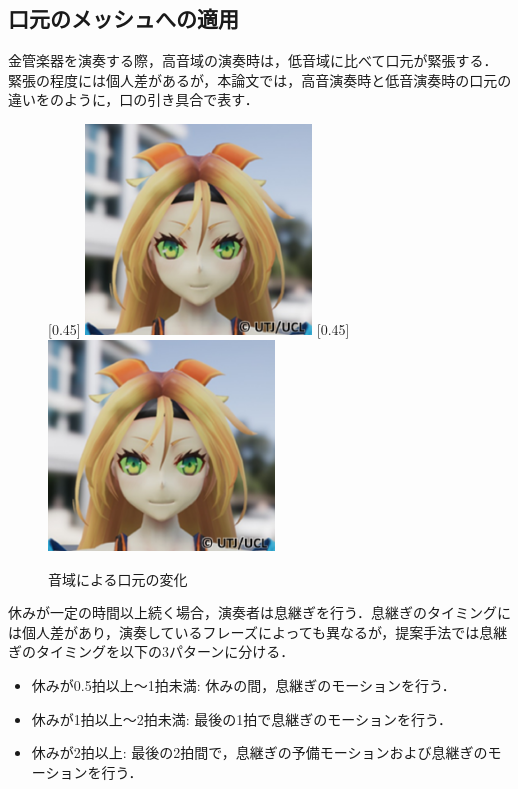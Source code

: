 \subsection{口元のメッシュへの適用}
\indent
金管楽器を演奏する際，高音域の演奏時は，低音域に比べて口元が緊張する．
緊張の程度には個人差があるが，本論文では，高音演奏時と低音演奏時の口元の違いをのように，口の引き具合で表す．\\
\begin{figure}[!h]
	\centering
	[0.45\linewidth]{
		\includegraphics[width=6cm]{fig/chap3/low.eps}}
	[0.45\linewidth]{
		\includegraphics[width=6cm]{fig/chap3/high.eps}}
	\caption{音域による口元の変化}
	\label{fig:mouth}
\end{figure}
\indent
休みが一定の時間以上続く場合，演奏者は息継ぎを行う．息継ぎのタイミングには個人差があり，演奏しているフレーズによっても異なるが，提案手法では息継ぎのタイミングを以下の3パターンに分ける．
\begin{itemize}
	\item 休みが0.5拍以上～1拍未満: 休みの間，息継ぎのモーションを行う．
	\item 休みが1拍以上～2拍未満: 最後の1拍で息継ぎのモーションを行う．
	\item 休みが2拍以上: 最後の2拍間で，息継ぎの予備モーションおよび息継ぎのモーションを行う．
\end{itemize}

